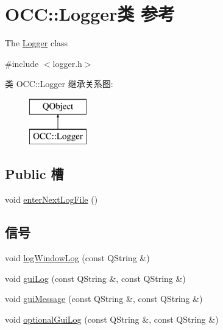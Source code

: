 \hypertarget{class_o_c_c_1_1_logger}{}\section{O\+CC\+:\+:Logger类 参考}
\label{class_o_c_c_1_1_logger}


The \hyperlink{class_o_c_c_1_1_logger}{Logger} class  




{\ttfamily \#include $<$logger.\+h$>$}

类 O\+CC\+:\+:Logger 继承关系图\+:\begin{figure}[H]
\begin{center}
\leavevmode
\includegraphics[height=2.000000cm]{class_o_c_c_1_1_logger}
\end{center}
\end{figure}
\subsection*{Public 槽}
\begin{DoxyCompactItemize}
\item 
void \hyperlink{class_o_c_c_1_1_logger_a4cea57bcc3f59713a978ffca4e8597d6}{enter\+Next\+Log\+File} ()
\end{DoxyCompactItemize}
\subsection*{信号}
\begin{DoxyCompactItemize}
\item 
void \hyperlink{class_o_c_c_1_1_logger_ae0252486f9745a0232f9ff8630c19293}{log\+Window\+Log} (const Q\+String \&)
\item 
void \hyperlink{class_o_c_c_1_1_logger_a45e0121f6b406973c6cbedfe5f21fa9c}{gui\+Log} (const Q\+String \&, const Q\+String \&)
\item 
void \hyperlink{class_o_c_c_1_1_logger_a37d442a31a0d3dec51f3a1b279c9bcbe}{gui\+Message} (const Q\+String \&, const Q\+String \&)
\item 
void \hyperlink{class_o_c_c_1_1_logger_a72c88900de8b73a028c2166699ea9966}{optional\+Gui\+Log} (const Q\+String \&, const Q\+String \&)
\end{DoxyCompactItemize}
